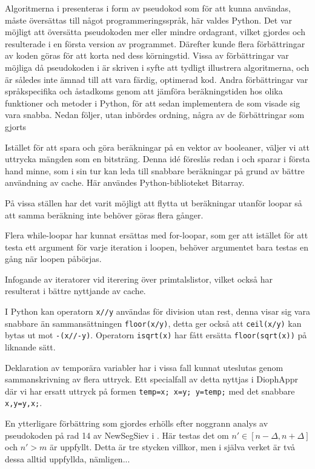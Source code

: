 
Algoritmerna i \cite{HaraldSieve} presenteras i form av pseudokod som för att kunna användas, måste översättas till något programmeringsspråk, här valdes Python.
Det var möjligt att översätta pseudokoden mer eller mindre ordagrant, vilket gjordes och resulterade i en första version av programmet.
Därefter kunde flera förbättringar av koden göras för att korta ned dess körningstid. 
Vissa av förbättringar var möjliga då pseudokoden i \cite{HaraldSieve} är skriven i syfte att tydligt illustrera algoritmerna,
och är således inte ämnad till att vara färdig, optimerad kod.
Andra förbättringar var språkspecifika och åstadkoms genom att jämföra beräkningstiden hos olika funktioner och metoder i Python, för att sedan implementera de som visade sig vara snabba. Nedan följer, utan inbördes ordning, några av de förbättringar som gjorts
\begin{myitemize}
    \item Istället för att spara och göra beräkningar på en vektor av booleaner, väljer vi att uttrycka mängden som en bitsträng. 
    Denna idé föreslås redan i \cite{HaraldSieve} och sparar i första hand minne,
    som i sin tur kan leda till snabbare beräkningar på grund av bättre användning av cache.
    Här användes Python-biblioteket Bitarray.
    \item På vissa ställen har det varit möjligt att flytta ut beräkningar utanför loopar så att samma beräkning inte behöver göras flera gånger.
    \item Flera while-loopar har kunnat ersättas med for-loopar,
    som ger att istället för att testa ett argument för varje iteration i loopen,
    behöver argumentet bara testas en gång när loopen påbörjas.
    \item Infogande av iteratorer vid iterering över primtalslistor, vilket också har resulterat i bättre nyttjande av cache.
    \item I Python kan operatorn \texttt{x//y} användas för division utan rest, denna visar sig vara snabbare än sammansättningen \texttt{floor(x/y)},
    detta ger också att \texttt{ceil(x/y)} kan bytas ut mot \texttt{-(x//-y)}. Operatorn \texttt{isqrt(x)} har fått ersätta \texttt{floor(sqrt(x))} på liknande sätt.
    \item Deklaration av temporära variabler har i vissa fall kunnat uteslutas genom sammanskrivning av flera uttryck. 
    Ett specialfall av detta nyttjas i DiophAppr där vi har ersatt uttryck på formen \texttt{temp=x; x=y; y=temp;} med det snabbare \texttt{x,y=y,x;}.
\end{myitemize}
En ytterligare förbättring som gjordes erhölls efter noggrann analys av pseudokoden på rad 14 av NewSegSiev i \cite[s.338]{HaraldSieve}.
Här testas det om $n'\in[n-\Delta,n+\Delta]$ och $n'>m$ är uppfyllt. 
Detta är tre stycken villkor, men i själva verket är två dessa alltid uppfyllda, nämligen...



